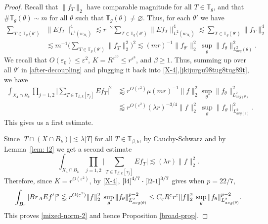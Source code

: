 \documentclass[10pt,a4paper]{amsart}
\newcommand{\Br}{{\rm{Br}}}
\newcommand{\ZT}{\mathbb{T}}
\newcommand{\be}{\beta}
\newcommand{\e}{\varepsilon}
\newcommand{\la}{\lambda}
\begin{document}
\begin{proof}
	Recall that $\|f_T\|_{2}$ have comparable magnitude for all $T\in\ZT_g$, and that $\#\ZT_g(\theta)\sim m$ for all $\theta$ such that $\ZT_g(\theta)\not=\varnothing$.
	Thus, for each $\theta'$ we have
	\begin{align}
		\nonumber
		\sum_{T\in\ZT_g(\theta')}&\big\|Ef_T\big\|_{L^4(w_{B_r})}^4\lesssim r^{-2}\sum_{T\in\ZT_g(\theta')}\big\|Ef_T\big\|_{L^2(w_{B_r})}^4\lesssim\sum_{T\in\ZT_g(\theta')}\|f_T\|_2^4\\
		\label{after-decoupling}
		&\lesssim m^{-1} \Big(\sum_{T\in\ZT_g(\theta')}\big\|f_T\big\|_{2}^2\Big)^2\lesssim  (mr)^{-1}\|f_{\theta'}\|_2^2\;\sup_\theta\|f_\theta\|_{L^2_{avg}(\theta)}^2.
	\end{align} 
	We recall that $O(\e_0)\leq\e^2$, $K=R^{\e^{10}}\leq r^{\e^8}$, and $\be\ge 1$.
	Thus, summing up over all $\theta'$ in \eqref{after-decoupling} and plugging it back into \eqref{X-4},\eqref{jkijurgu98tug8tug89t}, we have
	\begin{align}
		\label{l4}
		\int_{X_4\cap B_k}\prod_{j=1,2}\Big|\sum_{T\in\ZT_{\be, k}[\tau_j]}Ef_{T}\Big|^2&\lessapprox r^{O(\e^2)}\mu (m r)^{-1}\|f\|_2^2\sup_\theta\|f_\theta\|_{L^2_{avg(\theta)}}^2\\  \nonumber
		&\lessapprox r^{O(\e^{2})}(\la r)^{-3/4}\|f\|_2^2\;\sup_\theta\|f_\theta\|_{L^2_{avg(\theta)}}^2.
	\end{align}
    This gives us a first estimate.
	
	
	Since $|T\cap ( X\cap B_k)|\lesssim \la  |T|$ for all $T\in\ZT_{\beta,k}$, by Cauchy-Schwarz and by Lemma~\ref{lem: l2} we get a second estimate  
	\begin{equation}
		\label{l2-1}
		\int_{X_4\cap B_k}\prod_{j=1,2}\Big|\sum_{T\in\ZT_{\be, k}[\tau_j]}Ef_{T}\Big|\lesssim (\la  r)\|f\|_2^2.
	\end{equation}
	Therefore, since $K=r^{O(\e^2)}$, by \eqref{X-4}, $\eqref{l4}^{4/7}\cdot\eqref{l2-1}^{3/7}$ gives when $p=22/7$,
	\begin{align}
		\nonumber
		\int_{B_r}|\Br_{A} Ef'|^p\lessapprox r^{O(\e^2)} \|f\|_2^2\;\sup_\theta\|f_\theta\|_{L^2_{avg(\theta)}}^{p-2}\leq C_\e R^{\e}r^\e\|f\|_2^2\;\sup_\theta\|f_\theta\|_{L^2_{avg(\theta)}}^{p-2}.
	\end{align}
	This proves \eqref{mixed-norm-2} and hence Proposition \ref{broad-prop}. \qedhere
	
	
\end{proof}
\end{document}
